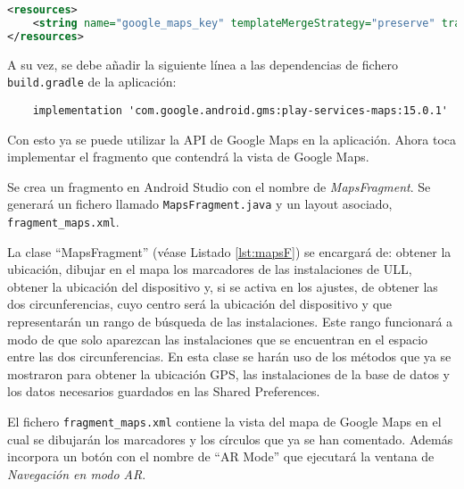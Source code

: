 \begin{lstlisting}[stringstyle=\color{purple},language=XML,caption={Fichero \texttt{google\_maps\_api.xml}.},  label={lst:apiMaps}]
<resources>
    <string name="google_maps_key" templateMergeStrategy="preserve" translatable="false">API_Maps</string>
</resources>
\end{lstlisting}
 
A su vez, se debe añadir la siguiente línea a las dependencias de fichero \texttt{build.gradle} de la aplicación:
 
\begin{lstlisting}
    implementation 'com.google.android.gms:play-services-maps:15.0.1'
\end{lstlisting}

Con esto ya se puede utilizar la API de Google Maps en la aplicación. Ahora toca implementar el fragmento que contendrá la vista de Google Maps. 

Se crea un fragmento en Android Studio con el nombre de \textit{MapsFragment}. Se generará un fichero llamado \texttt{MapsFragment.java} y un layout asociado, \texttt{fragment\_maps.xml}.

La clase ``MapsFragment'' (véase Listado \ref{lst:mapsF}) se encargará de: obtener la ubicación, dibujar en el mapa los marcadores de las instalaciones de ULL, obtener la ubicación del dispositivo y, si se activa en los ajustes, de obtener las dos circunferencias, cuyo centro será la ubicación del dispositivo y que representarán un rango de búsqueda de las instalaciones. Este rango funcionará a modo de que solo aparezcan las instalaciones que se encuentran en el espacio entre las dos circunferencias. En esta clase se harán uso de los métodos que ya se mostraron para obtener la ubicación GPS, las instalaciones de la base de datos y los datos necesarios guardados en las Shared Preferences.   

\bigskip



El fichero \texttt{fragment\_maps.xml} contiene la vista del mapa de Google Maps en el cual se dibujarán los marcadores y los círculos que ya se han comentado. Además incorpora un botón con el nombre de ``AR Mode'' que ejecutará la ventana de \textit{Navegación en modo AR}.

% 
    

